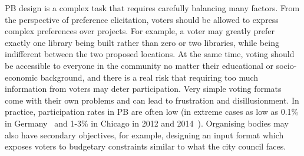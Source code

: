 \documentclass[letterpaper]{article} %
\newcommand{\kibitz}[2]{\ifnum\Comments=1{\color{#1}{#2}}\fi}
\newcommand{\rf}[1]{\kibitz{blue}{[Roy says:#1]}}
\newcommand{\gb}[1]{\kibitz{brown}{[GB:#1]}}
\begin{document}
 PB  design is a complex task that   requires carefully balancing many factors. From the perspective of preference elicitation,   voters should be allowed to express complex preferences over projects.  For example, a voter may greatly prefer exactly one library being built rather than zero or two libraries, while being indifferent between the two proposed locations. At the same time, voting should be accessible to everyone in the community no matter their educational or socio-economic background, and there is a real risk that requiring too much information from voters may deter   participation. 
Very simple voting formats   come with their own problems and can lead to frustration and disillusionment. %
In practice,   participation rates in PB are often low  (in extreme cases as low as 0.1\% in Germany~\citep{zepic2017participatory} and 1-3\%   in Chicago in 2012 and 2014~\citep{stewart2014participatory,carroll2016democratizing}). %
Organising bodies  may also have secondary objectives, for example, designing an input format which exposes voters to   budgetary constraints similar to what the city council faces.

\end{document}
